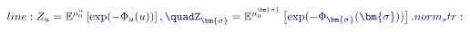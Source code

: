 \documentclass[12pt]{article}
\begin{document}
\makeatletter
\renewcommand*{\@textcolor}[3]{%
  \protect\leavevmode
  \begingroup
    \color#1{#2}#3%
  \endgroup
}
\makeatother
\begin{displaymath}
\mathcolor[RGB]{0,0,15}{line:
Z_{u}} \mathcolor[RGB]{0,0,30}{=} \mathcolor[RGB]{0,0,45}{\mathbb{E}^{\mu_0^u}\left[} \mathcolor[RGB]{0,0,60}{\exp(-\Phi_{u}(u))} \mathcolor[RGB]{0,0,75}{\right],} \mathcolor[RGB]{0,0,90}{\quadZ_{\bm{\sigma}}} \mathcolor[RGB]{0,0,105}{=} \mathcolor[RGB]{0,0,120}{\mathbb{E}^{\mu_0^{\bm{\sigma}}}\left[} \mathcolor[RGB]{0,0,135}{\exp(-\Phi_{\bm{\sigma}}(\bm{\sigma}))} \mathcolor[RGB]{0,0,150}{\right].

norm_str:}
\end{displaymath}
\end{document}
